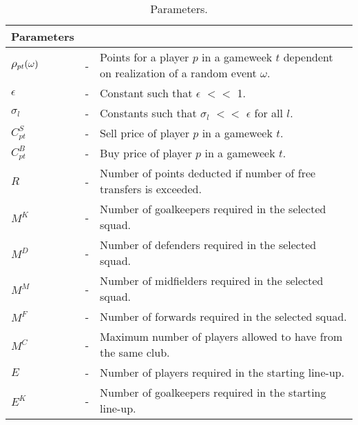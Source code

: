 \begin{table}[H]
\tabcolsep=0.11cm
\centering
\caption{Parameters.}
\begin{tabular}{@{}lll@{}}
\toprule
Parameters                       &   &                                                                                                \\ \midrule
$\mathlarger{\rho_{pt}(\omega)}$ & - & Points for a player $p$ in a gameweek $t$ dependent on realization of a random event $\omega$. \\
$\epsilon$                       & - & Constant such that $\epsilon$ $<<$ 1.                                                                     \\
$\sigma_{l}$                     & - & Constants such that $\sigma_{l}$ $<<$ $\epsilon$ for all $l$.                                               \\
$C_{pt}^{S}$                     & - & Sell price of player $p$ in a gameweek $t$.                                                    \\
$C_{pt}^{B}$                     & - & Buy price of player $p$ in a gameweek $t$.                                                     \\
$R$                              & - & Number of points deducted if number of free transfers is exceeded.        \\
$M^{K}$                          & - & Number of goalkeepers required in the selected squad.                                           \\
$M^{D}$                          & - & Number of defenders required in the selected squad.                                             \\
$M^{M}$                          & - & Number of midfielders required in the selected squad.                                           \\
$M^{F}$                          & - & Number of forwards required in the selected squad.                                              \\
$M^{C}$                          & - & Maximum number of players allowed to have from the same club.                                         \\
$E$                              & - & Number of players required in the starting line-up.                                               \\
$E^{K}$                          & - & Number of goalkeepers required in the starting line-up.                                           \\

\end{tabular}
\end{table}
